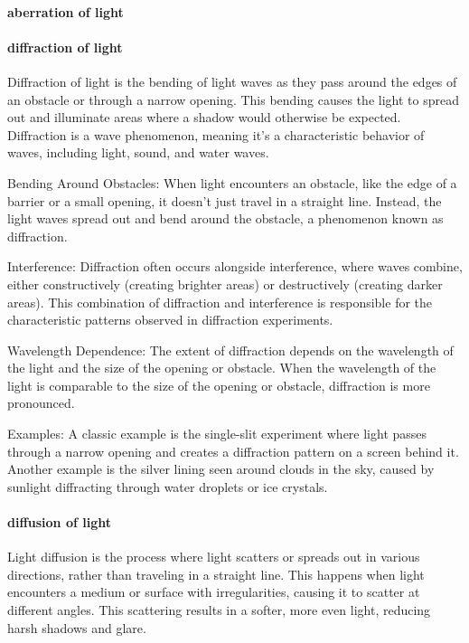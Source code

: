 \documentclass[a4paper]{article}
\theoremstyle{plain}
\theoremstyle{definition}
\begin{document}
\paragraph{aberration of light}

\paragraph{diffraction of light}

Diffraction of light is the bending of light waves as they pass around
the edges of an obstacle or through a narrow opening.  This bending
causes the light to spread out and illuminate areas where a shadow
would otherwise be expected.  Diffraction is a wave phenomenon,
meaning it's a characteristic behavior of waves, including light,
sound, and water waves.

Bending Around Obstacles: When light encounters an obstacle, like the
edge of a barrier or a small opening, it doesn't just travel in a
straight line.  Instead, the light waves spread out and bend around
the obstacle, a phenomenon known as diffraction.

Interference: Diffraction often occurs alongside interference, where
waves combine, either constructively (creating brighter areas) or
destructively (creating darker areas).  This combination of diffraction
and interference is responsible for the characteristic patterns
observed in diffraction experiments.

Wavelength Dependence: The extent of diffraction depends on the
wavelength of the light and the size of the opening or obstacle.  When
the wavelength of the light is comparable to the size of the opening
or obstacle, diffraction is more pronounced.

Examples: A classic example is the single-slit experiment where light
passes through a narrow opening and creates a diffraction pattern on a
screen behind it.  Another example is the silver lining seen around
clouds in the sky, caused by sunlight diffracting through water
droplets or ice crystals.


\paragraph{diffusion of light}

Light diffusion is the process where light scatters or spreads out in
various directions, rather than traveling in a straight line.  This
happens when light encounters a medium or surface with irregularities,
causing it to scatter at different angles.  This scattering results in
a softer, more even light, reducing harsh shadows and glare.
\end{document}

